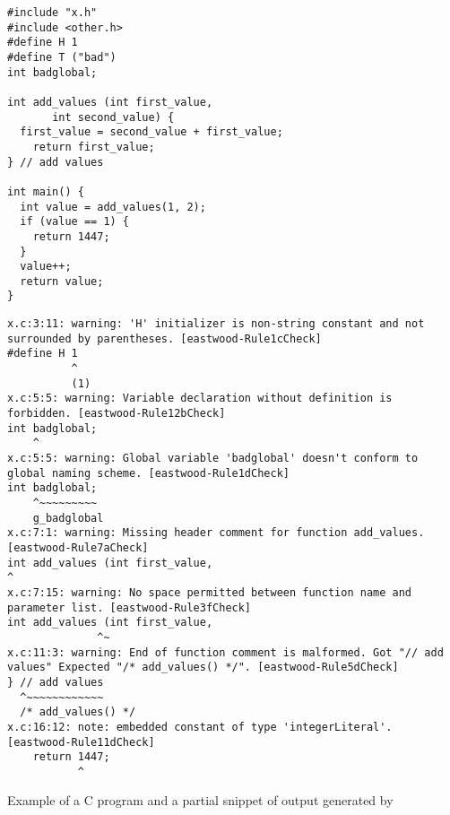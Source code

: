 \documentclass[sigconf]{acmart}
\begin{document}
% 

\begin{listing*}[!ht]
\begin{minipage}[]{0.35\linewidth}
\begin{verbatim}
#include "x.h"
#include <other.h>
#define H 1
#define T ("bad")
int badglobal;

int add_values (int first_value,
       int second_value) {
  first_value = second_value + first_value;
    return first_value;
} // add values

int main() {
  int value = add_values(1, 2);
  if (value == 1) {
    return 1447;
  }
  value++;
  return value;
}
\end{verbatim}
\vspace{1.5cm}
\end{minipage}
\hfill
\begin{minipage}[]{0.60\linewidth}
\begin{verbatim}
x.c:3:11: warning: 'H' initializer is non-string constant and not surrounded by parentheses. [eastwood-Rule1cCheck]
#define H 1
          ^
          (1)
x.c:5:5: warning: Variable declaration without definition is forbidden. [eastwood-Rule12bCheck]
int badglobal;
    ^
x.c:5:5: warning: Global variable 'badglobal' doesn't conform to global naming scheme. [eastwood-Rule1dCheck]
int badglobal;
    ^~~~~~~~~~
    g_badglobal
x.c:7:1: warning: Missing header comment for function add_values. [eastwood-Rule7aCheck]
int add_values (int first_value,
^
x.c:7:15: warning: No space permitted between function name and parameter list. [eastwood-Rule3fCheck]
int add_values (int first_value,
              ^~
x.c:11:3: warning: End of function comment is malformed. Got "// add values" Expected "/* add_values() */". [eastwood-Rule5dCheck]
} // add values
  ^~~~~~~~~~~~~
  /* add_values() */
x.c:16:12: note: embedded constant of type 'integerLiteral'. [eastwood-Rule11dCheck]
    return 1447;
           ^
\end{verbatim}
\end{minipage}
\caption{Example of a C program and a partial snippet of output generated by \tool{}}
\label{lst:example}
\end{listing*}
\end{document}
